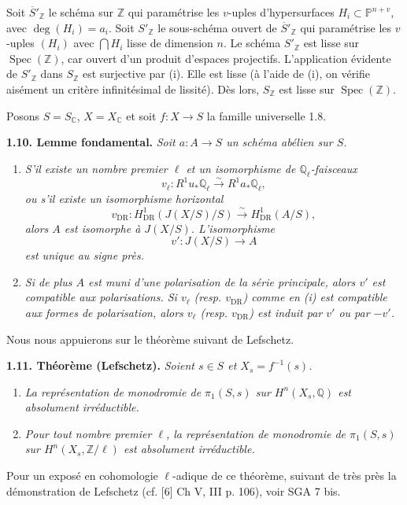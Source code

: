\documentclass[10pt]{article}
\newcommand{\C}{\mathbb C}
\newcommand{\Pj}{\mathbb P}
\newcommand{\Q}{\mathbb Q}
\newcommand{\Z}{\mathbb Z}
\newcommand{\DR}{\mathrm{DR}}
\newcommand{\Spec}{\operatorname{Spec}}
\newcommand{\iso}{\xrightarrow{\sim}}
\newcommand{\sourcebreak}{\clearpage}
\begin{document}
\sourcebreak
Soit \(\overline{S}'_\Z\) le schéma sur \(\Z\) qui paramétrise les \(v\)-uples d'hypersurfaces \(H_i\subset\Pj^{n+v}\), avec \(\deg(H_i)=a_i\). Soit \(S'_\Z\) le sous-schéma ouvert de \(\overline{S}'_\Z\) qui paramétrise les \(v\)-uples \((H_i)\) avec \(\bigcap H_i\) lisse de dimension \(n\). Le schéma \(S'_\Z\) est lisse sur \(\Spec(\Z)\), car ouvert d'un produit d'espaces projectifs. L'application évidente de \(S'_\Z\) dans \(S_\Z\) est surjective par (i). Elle est lisse (à l'aide de (i), on vérifie aisément un critère infinitésimal de lissité). Dès lors, \(S_\Z\) est lisse sur \(\Spec(\Z)\).

Posons \(S=S_\C\), \(X=X_\C\) et soit \(f:X\to S\) la famille universelle 1.8.

\noindent\textbf{1.10. Lemme fondamental.} \emph{Soit \(a:A\to S\) un schéma abélien sur \(S\).}
\begin{enumerate}[label=(\roman*)]
\item \emph{S'il existe un nombre premier \(\ell\) et un isomorphisme de \(\Q_\ell\)-faisceaux}
\[
 v_\ell:R^1u_*\Q_\ell\iso R^1a_*\Q_\ell,
\]
\emph{ou s'il existe un isomorphisme horizontal}
\[
 v_{\DR}:H^1_{\DR}(J(X/S)/S)\iso H^1_{\DR}(A/S),
\]
\emph{alors \(A\) est isomorphe à \(J(X/S)\). L'isomorphisme}
\[
 v':J(X/S)\longrightarrow A
\]
\emph{est unique au signe près.}
\item \emph{Si de plus \(A\) est muni d'une polarisation de la série principale, alors \(v'\) est compatible aux polarisations. Si \(v_\ell\) (resp. \(v_{\DR}\)) comme en (i) est compatible aux formes de polarisation, alors \(v_\ell\) (resp. \(v_{\DR}\)) est induit par \(v'\) ou par \(-v'\).}
\end{enumerate}

Nous nous appuierons sur le théorème suivant de Lefschetz.

\noindent\textbf{1.11. Théorème (Lefschetz).} \emph{Soient \(s\in S\) et \(X_s=f^{-1}(s)\).}
\begin{enumerate}[label=(\roman*)]
\item \emph{La représentation de monodromie de \(\pi_1(S,s)\) sur \(H^n(X_s,\Q)\) est absolument irréductible.}
\item \emph{Pour tout nombre premier \(\ell\), la représentation de monodromie de \(\pi_1(S,s)\) sur \(H^n(X_s,\Z/\ell)\) est absolument irréductible.}
\end{enumerate}
Pour un exposé en cohomologie \(\ell\)-adique de ce théorème, suivant de très près la démonstration de Lefschetz (cf. [6] Ch V, III p. 106), voir SGA 7 bis.
\end{document}
